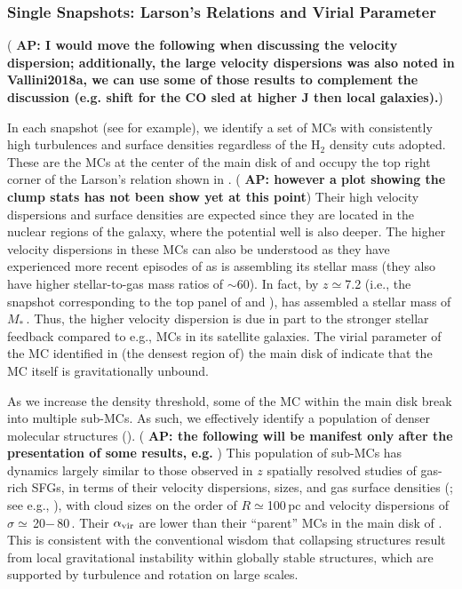 \documentclass[apj]{emulateapj} %
\newcommand{\AP}[1]{({\bf \color{apcolor} AP: #1})}
\begin{document}
{\subsubsection{Single Snapshots: Larson's Relations and Virial Parameter}  \label{sec:singless}

%
\AP{I would move the following when discussing the velocity dispersion; additionally, the large velocity dispersions was also noted in Vallini2018a, we can use some of those results to complement the discussion (e.g. shift for the CO sled at higher J then local galaxies).}

In each snapshot (see  for example),
we identify a set of MCs with consistently high turbulences and surface densities
regardless of the H$_2$ density cuts adopted.
These are the MCs at the center of the main disk of \flower and
occupy the top right corner of the Larson's relation shown in .
\AP{however a plot showing the clump stats has not been show yet at this point}
Their high velocity dispersions and surface densities are expected since
they are located in the nuclear regions of the
galaxy, where the potential well is also deeper. The higher velocity dispersions
in these MCs can also be understood as they have experienced more recent episodes
of \SF as \flower is assembling its stellar mass (they also have higher stellar-to-gas mass ratios of $\sim$60).
In fact, by $z\simeq$7.2 (i.e., the snapshot corresponding
to the top panel of  and ), \flower has assembled
a stellar mass of $M_*$\,\Msun. Thus, the higher velocity dispersion
is due in part to the stronger stellar feedback compared to e.g., MCs in its satellite galaxies.
The virial parameter of the MC identified in (the densest region of) the main disk of \flower
indicate that the MC itself is gravitationally unbound.

As we increase the density threshold, some of the MC within the main disk break
into multiple sub-MCs.
As such, we effectively identify a population of denser molecular structures  ().
\AP{the following will be manifest only after the presentation of some results, e.g. \Fig{alpha16}}
This population of sub-MCs has dynamics largely
similar to those observed
in $z$ spatially resolved studies of gas-rich SFGs, in
terms of their velocity dispersions, sizes, and gas surface densities (; see
e.g., \citealt{Swinbank11a}),
with cloud sizes on the order of $R\simeq$100\,pc and velocity
dispersions of $\sigma\simeq$\,20$-$\,80\,\kms. Their $\alpha_{\rm vir}$
are lower than their ``parent'' MCs in the main disk of \flower. This is consistent with
the conventional wisdom that collapsing structures result from local gravitational
instability within globally stable structures, which are supported by
turbulence and rotation on large scales.

}
\end{document}
